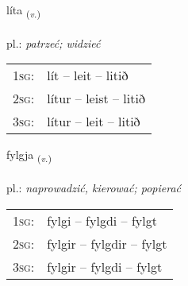 \documentclass[frontgrid, backgrid]{flacards}\usepackage[]{graphicx}\usepackage[]{xcolor}
\begin{document}
{líta \small{\textsubscript{(\textit{v.})}} \\[1ex] %
\textphonetic{[liːta]} \\
pl.: \emph{patrzeć; widzieć} \\  [2ex]
\renewcommand*{\arraystretch}{0.8}
\begin{tabular}{p{1cm}l}
\textsc{1sg}: & lít -- leit -- litið \\ 
\textsc{2sg}: & lítur -- leist -- litið \\ 
\textsc{3sg}: & lítur -- leit -- litið \\ 
\end{tabular}
}

\renewcommand{\flhead}{\vskip5pt \fboxsep=0pt {\small\bfseries\footnotesize Sagnorð | Verb}}
\renewcommand{\fcfoot}{\vskip5pt \fboxsep=0pt \hspace{2pt}{\small\bfseries\footnotesize 1K}}

\renewcommand{\blhead}{\vskip5pt {\small\bfseries\footnotesize Sagnorð | Verb }}
\renewcommand{\bcfoot}{\vskip5pt \hspace{2pt}{\small\bfseries\footnotesize 1K}}


{fylgja \small{\textsubscript{(\textit{v.})}} \\[1ex] %
\textphonetic{[fɪlca]} \\
pl.: \emph{naprowadzić, kierować; popierać} \\  [2ex]
\renewcommand*{\arraystretch}{0.8}
\begin{tabular}{p{1cm}l}
\textsc{1sg}: & fylgi -- fylgdi -- fylgt \\ 
\textsc{2sg}: & fylgir -- fylgdir -- fylgt \\ 
\textsc{3sg}: & fylgir -- fylgdi -- fylgt \\ 
\end{tabular}
}

\renewcommand{\flhead}{\vskip5pt \fboxsep=0pt {\small\bfseries\footnotesize Nafnorð | Noun}}
\renewcommand{\fcfoot}{\vskip5pt \fboxsep=0pt \hspace{2pt}{\small\bfseries\footnotesize 1K}}
\end{document}

